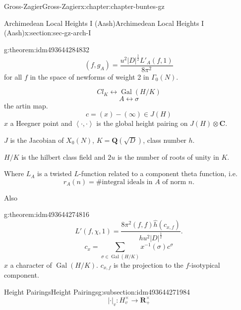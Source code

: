 \documentclass[oneside,10pt,]{book}
\numberwithin{equation}{section}
\newcommand{\inv}{^{-1}}
\newcommand{\pair}[2]{\left\langle #1, #2 \right\rangle}
\newcommand{\QQ}{\mathbf{Q}}
\newcommand{\RR}{\mathbf{R}}
\newcommand{\CC}{\mathbf{C}}
\newcommand{\Gal}[2]{\operatorname{Gal}(#1/#2)}
\begin{document}
\begin{chapterptx}{Gross-Zagier}{}{Gross-Zagier}{}{}{x:chapter:chapter-buntes-gz}
\begin{sectionptx}{Archimedean Local Heights I (Aash)}{}{Archimedean Local Heights I (Aash)}{}{}{x:section:sec-gz-arch-I}
\begin{introduction}{}
\begin{theorem}{}{}{g:theorem:idm493644284832}
\begin{equation*}
(f,g_A) = \frac{u^2 |D|^{\frac 12} L'_A(f,1)}{8\pi ^2}
\end{equation*}
for all \(f\) in the space of newforms of weight 2 in \(\Gamma _0(N)\).%
\end{theorem}
%
\begin{equation*}
Cl_K \leftrightarrow \Gal HK
\end{equation*}
%
\begin{equation*}
A \leftrightarrow \sigma 
\end{equation*}
the artin map.%
\begin{equation*}
c = (x) - (\infty ) \in J(H)
\end{equation*}
\(x\) a Heegner point and \(\pair \cdot\cdot\) is the global height pairing on \(J(H) \otimes \CC\).%
\par
\(J\) is the Jacobian of \(X_0(N)\), \(K = \QQ(\sqrt{D})\), class  number \(h\).%
\par
\(H/K\) is the hilbert class field and \(2u\) is the number of roots of unity in \(K\).%
\par
Where \(L_A\) is a twisted \(L\)-function related to a component theta function, i.e.%
\begin{equation*}
r_A(n) =\# \text{integral ideals in } A \text{ of norm }n\text{.}
\end{equation*}
%
\par
Also%
\begin{theorem}{}{}{g:theorem:idm493644274816}%
%
\begin{equation*}
L'(f,\chi ,1) = \frac{8\pi ^2 (f, f) \hat h(c_{x,f})}{hu^2 |D|^{\frac12}}\text{.}
\end{equation*}
%
\begin{equation*}
c_x = \sum_{\sigma \in \Gal HK} x\inv(\sigma ) c^\sigma 
\end{equation*}
\(x\) a character of \(\Gal HK\). \(c_{x,f}\) is the projection to the \(f\)-isotypical component.%
\end{theorem}
\end{introduction}%
%
%
\typeout{************************************************}
\typeout{************************************************}
%
\begin{subsectionptx}{Height Pairings}{}{Height Pairings}{}{}{g:subsection:idm493644271984}
%
\begin{equation*}
| \cdot |_v \colon  H_v^\times \to \RR_+^\times
\end{equation*}
%
\begin{equation*}

\end{equation*}
\end{subsectionptx}
\end{sectionptx}
\end{chapterptx}
\end{document}
